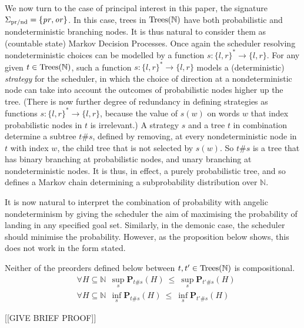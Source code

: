 We now turn to the case of principal interest in this paper, the signature $\Sigma_{\text{pr/nd}} = \{\operatorname{\mathit{pr}},\operatorname{\mathit{or}}\}$.
In this case, trees in $\textnormal{Trees}(\mathbb{N})$ have both probabilistic and nondeterministic branching nodes.
It is thus natural to consider them as (countable state) Markov Decision Processes. Once again the 
scheduler resolving nondeterministic
choices can be modelled by a 
function $s: \{l,r\}^* \to \{l,r\}$. For any given $t \in \textnormal{Trees}(\mathbb{N})$, such a function
$s: \{l,r\}^* \to \{l,r\}$ models a (deterministic) \emph{strategy} for the scheduler, in which the choice of direction at a nondeterministic node  
can take into account the outcomes of probabilistic nodes higher up the tree.
(There is now further degree of redundancy in defining strategies as functions $s: \{l,r\}^* \to \{l,r\}$, because the value of $s(w)$ on words $w$ that index 
probabilistic nodes in $t$ is irrelevant.) A strategy $s$ and a tree $t$ in combination determine a subtree $t\#s$, defined by 
removing, at every nondeterministic node in $t$ with index $w$, the child tree that is not selected by $s(w)$. So $t\#s$ is a tree that has binary branching at probabilistic nodes, and unary branching at nondeterministic nodes. It is thus, in effect, a purely probabilistic tree, and so defines a Markov chain determining a subprobability distribution over $\mathbb{N}$. 

It is now natural to interpret the combination of probability with angelic nondeterminism 
by giving the scheduler the aim of maximising the probability of landing in any specified goal set. Similarly, in the demonic case, the scheduler should minimise the probability. However, as the proposition below shows, 
this does not work in the form stated. 
\begin{proposition}
Neither of the preorders defined below between $t,t' \in \textnormal{Trees}(\mathbb{N})$ is compositional.
\begin{align*}
& \forall H \subseteq \mathbb{N}  ~~ \sup_s  \mathbf{P}_{t\#s} (H)~ \leq~ \sup_s \mathbf{P}_{t'\#s} (H)
\\
& \forall H \subseteq \mathbb{N}  ~~ \inf_s  \mathbf{P}_{t\#s} (H)~ \leq~ \inf_s \mathbf{P}_{t'\#s} (H)
\end{align*}
\end{proposition}

[[GIVE BRIEF PROOF]]

